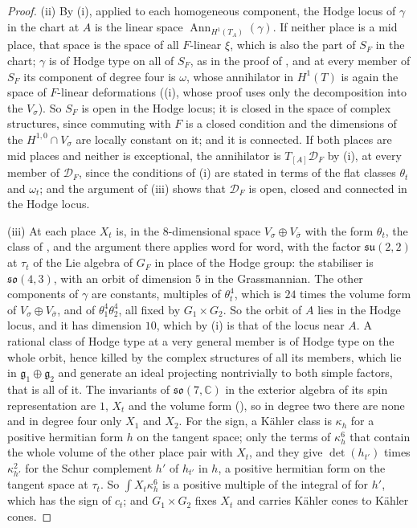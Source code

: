 \documentclass[11pt,reqno]{amsart}
\theoremstyle{plain}
\theoremstyle{definition}
\theoremstyle{remark}
\newcommand{\CC}{\mathbb{C}}
\newcommand{\cD}{\mathcal{D}}
\DeclareMathOperator{\Ann}{Ann}
\newcommand{\bbar}[1]{\overline{#1}}
\begin{document}
\begin{proof}
(ii) By (i), applied to each homogeneous component,
the Hodge locus of $\gamma$ in the chart at $A$ is the linear space
$\Ann_{H^{1}(T_{A})}(\gamma)$. If neither place is a mid place, that space is
the space of all $F$-linear $\xi$, which is also the part of $S_{F}$ in the
chart; $\gamma$ is of Hodge type on all of $S_{F}$, as in the proof of
, and at every member of $S_{F}$ its component of
degree four is $\omega$, whose annihilator in $H^{1}(T)$ is again the space of
$F$-linear deformations ((i), whose proof uses only
the decomposition into the $V_{\sigma}$). So $S_{F}$ is open in the Hodge locus;
it is closed in the space of complex structures, since commuting with $F$ is a
closed condition and the dimensions of the $H^{1,0}\cap V_{\sigma}$ are
locally constant on it; and it is connected. If both places are mid places
and neither is exceptional, the annihilator is $T_{[A]}\cD_{F}$ by (i), at
every member of $\cD_{F}$, since the conditions of (i) are stated in terms of
the flat classes $\theta_{t}$ and $\omega_{t}$; and the argument of
(iii) shows that $\cD_{F}$ is open, closed and
connected in the Hodge locus.

(iii) At each place $X_{t}$ is, in the $8$-dimensional space
$V_{\sigma}\oplus V_{\bbar\sigma}$ with the form $\theta_{t}$, the class of
, and the argument there applies word for
word, with the factor $\mathfrak{su}(2,2)$ at $\tau_{t}$ of the Lie algebra of $G_{F}$
in place of the Hodge group: the stabiliser is $\mathfrak{so}(4,3)$, with an
orbit of dimension $5$ in the Grassmannian. The other components of $\gamma$ are constants, multiples of
$\theta_{t}^{4}$, which is $24$ times the volume form of
$V_{\sigma}\oplus V_{\bbar\sigma}$, and of $\theta_{1}^{4}\theta_{2}^{4}$, all
fixed by $G_{1}\times G_{2}$. So the orbit of $A$ lies in the Hodge locus,
and it has dimension $10$, which by (i) is that of the locus near $A$. A
rational class of Hodge type at a very general member is of Hodge type on the
whole orbit, hence killed by the complex structures of all its members,
which lie in $\mathfrak{g}_{1}\oplus\mathfrak{g}_{2}$ and generate an ideal
projecting nontrivially to both simple factors, that is all of it. The
invariants of $\mathfrak{so}(7,\CC)$ in the exterior algebra of its spin
representation are $1$, $X_{t}$ and the volume form
(), so in degree two there are none and in
degree four only $X_{1}$ and $X_{2}$. For the sign, a K\"ahler class is
$\kappa_{h}$ for a positive hermitian form $h$ on the tangent space; only the
terms of $\kappa_{h}^{6}$ that contain the whole volume of the other place pair
with $X_{t}$, and they give $\det(h_{t'})$ times $\kappa_{h'}^{2}$ for the
Schur complement $h'$ of $h_{t'}$ in $h$, a positive hermitian form on the
tangent space at $\tau_{t}$. So $\int X_{t}\kappa_{h}^{6}$ is a positive
multiple of the integral of  for $h'$, which has
the sign of $c_{t}$; and $G_{1}\times G_{2}$ fixes $X_{t}$ and carries K\"ahler
cones to K\"ahler cones.


\end{proof}
\end{document}
